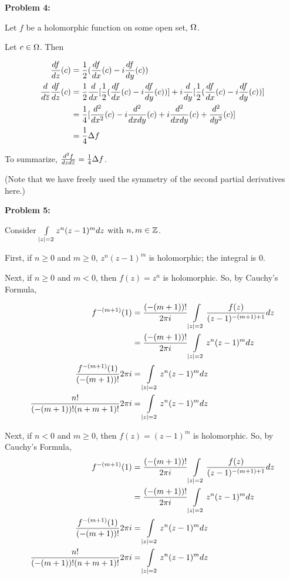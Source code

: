 \documentclass[a4paper,12pt]{article}
\begin{document}
\shunt

{\bf Problem 4:}

Let $f$ be a holomorphic function on some open set, $\Omega$.

Let $c \in \Omega$. Then 

\begin{align*}
\frac{df}{dz}(c) &= \frac{1}{2}(\frac{df}{dx}(c)-i\frac{df}{dy}(c))\\
\frac{d}{d\overline{z}}\frac{df}{dz}(c) &= \frac{1}{2} \frac{d}{dx}[\frac{1}{2}(\frac{df}{dx}(c)-i\frac{df}{dy}(c))] +i\frac{d}{dy}[\frac{1}{2}(\frac{df}{dx}(c)-i\frac{df}{dy}(c))]\\
&=\frac{1}{4}[\frac{d^2}{dx^2}(c) -i\frac{d^2}{dxdy}(c) +i\frac{d^2}{dxdy}(c) + \frac{d^2}{dy^2}(c)]\\
&=\frac{1}{4}\Delta f
\end{align*}

To summarize, $\frac{d^2f}{dzd\overline{z}} = \frac{1}{4} \Delta f$.

(Note that we have freely used the symmetry of the second partial derivatives here.)

\shunt

{\bf Problem 5:} %

Consider $\int\limits_{\left\lvert z \right\rvert = 2} z^n(z-1)^m dz$ with $n, m \in \mathbb{Z}$.

First, if $n \geq 0$ and $m \geq 0$, $z^n(z-1)^m$ is holomorphic; the integral is $0$.

\vspace{5mm}

Next, if $n \geq 0$ and $m < 0$, then $f(z)=z^n$ is holomorphic. So, by Cauchy's Formula, 

\begin{align*}
f^{-(m+1)}(1) &= \frac{(-(m+1))!}{2\pi i} \int\limits_{\left\lvert z \right\rvert=2} \frac{f(z)}{(z-1)^{-(m+1)+1}} dz\\
&= \frac{(-(m+1))!}{2\pi i} \int\limits_{\left\lvert z \right\rvert=2} z^n(z-1)^m dz\\
\frac{f^{-(m+1)}(1)}{(-(m+1))!} 2\pi i &= \int\limits_{\left\lvert z \right\rvert=2} z^n(z-1)^m dz\\
\frac{n!}{(-(m+1))!(n+m+1)!} 2\pi i &= \int\limits_{\left\lvert z \right\rvert=2} z^n(z-1)^m dz\\
\end{align*}

\vspace{5mm}

Next, if $n < 0$ and $m \geq 0$, then $f(z)=(z-1)^m$ is holomorphic. So, by Cauchy's Formula, 
\begin{align*}
f^{-(m+1)}(1) &= \frac{(-(m+1))!}{2\pi i} \int\limits_{\left\lvert z \right\rvert=2} \frac{f(z)}{(z-1)^{-(m+1)+1}} dz\\
&= \frac{(-(m+1))!}{2\pi i} \int\limits_{\left\lvert z \right\rvert=2} z^n(z-1)^m dz\\
\frac{f^{-(m+1)}(1)}{(-(m+1))!} 2\pi i &= \int\limits_{\left\lvert z \right\rvert=2} z^n(z-1)^m dz\\
\frac{n!}{(-(m+1))!(n+m+1)!} 2\pi i &= \int\limits_{\left\lvert z \right\rvert=2} z^n(z-1)^m dz\\
\end{align*}
\vspace{5mm}
\end{document}
